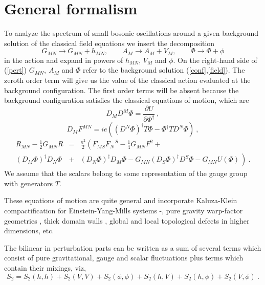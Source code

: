 \documentclass[a4paper,12pt]{article}
\begin{document}
\section{General formalism}
To analyze the spectrum of small bosonic oscillations around a given
background solution of the classical field equations we insert the
decomposition
\begin{equation}
G_{MN}\rightarrow  G_{MN} + h_{MN},\quad\quad
A_M  \rightarrow  A_M + V_M,\quad\quad
\Phi \rightarrow \Phi +\phi
\label{pert}
\end{equation}
in the action and expand in powers of $h_{MN}$, $V_M$ and $\phi$. On
the right-hand side of (\ref{pert}) $G_{MN},~A_M$ and $\Phi$ refer to
the background solution (\ref{conf},\ref{field}).  The zeroth order
term will give us the value of the classical action evaluated at the
background configuration. The first order terms will be absent
because the background configuration satisfies the classical
equations of motion, which are
\begin{equation}
D_M D^M\Phi = \frac{\partial U}{\partial\Phi^\dagger}~,
\label{sca}
\end{equation}
\begin{equation}
D_M F^{MN} = ie\left((D^N \Phi)^{\dagger} T\Phi -
\Phi^{\dagger}TD^N\Phi\right)~,
\label{YM}
\end{equation}
\begin{eqnarray}
R_{MN}- \frac{1}{2}G_{MN}R &=&
 \frac{\kappa^2}{2}\left(F_{MS}F_N^{\quad S} -
\frac{1}{4}G_{MN}F^2
\right.+\\
(D_M \Phi)^{\dagger} D_N\Phi &+&(D_N \Phi)^{\dagger} D_M\Phi -
\nonumber
\left. G_{MN} (D_S\Phi)^{\dagger}  D^S\Phi - G_{MN} U(\Phi)
\frac{}{}\right)~.
\label{Ei}
\end{eqnarray}
We assume that the scalars belong to some representation of the
gauge group with generators $T$.

These equations of motion are quite general and incorporate
Kaluza-Klein compactification for Einstein-Yang-Mills systems
\cite{Randjbar-Daemi:1982hi}-\cite{ Randjbar-Daemi:1983qb}, pure
gravity warp-factor geometries
\cite{Rubakov:1983bz,Randjbar-Daemi:1985wg}, thick domain walls
\cite{DeWolfe:1999cp,Csaki:2000fc}, global
\cite{Cohen:1999ia,Gregory:1999gv,Olasagasti:2000gx} and local
\cite{Gherghetta:2000qi,Giovannini:2001hh} topological defects in
higher dimensions, etc.

The bilinear in perturbation parts can be written as a sum of several
terms which consist of pure gravitational, gauge and scalar
fluctuations plus terms which contain their mixings, viz,
\begin{equation}
S_2 = S_2(h,h) + S_2(V,V) + S_2(\phi,\phi) + S_2(h,V) +
S_2(h,\phi) + S_2(V,\phi)~.
\label{S_2}
\end{equation}
\end{document}
